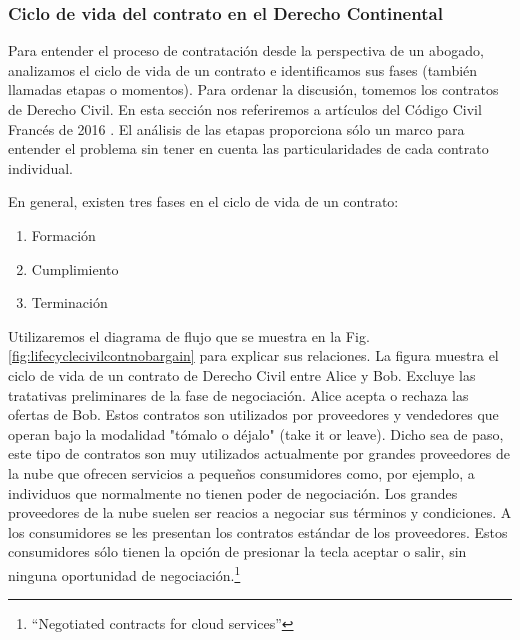 \documentclass[12pt]{report} %
\begin{document}
\subsubsection{ Ciclo de vida del contrato en el Derecho Continental}


Para entender el proceso de contratación desde la perspectiva de un abogado, analizamos el ciclo de vida de un contrato e identificamos sus fases (también llamadas etapas o momentos). Para ordenar la discusión, tomemos los contratos de Derecho Civil. En esta sección nos referiremos a artículos del Código Civil Francés de 2016 . El análisis de las etapas proporciona sólo un marco para entender el problema sin tener en cuenta las particularidades de cada contrato individual. 

En general, existen tres fases en el ciclo de vida de un contrato:


\begin{enumerate}
    \item Formación 
    \item Cumplimiento
    \item Terminación   
\end{enumerate}

Utilizaremos el diagrama de flujo que se muestra en la Fig. \ref{fig:lifecyclecivilcontnobargain} para explicar sus relaciones. La figura muestra el ciclo de vida de un contrato de Derecho Civil entre Alice y Bob. Excluye las tratativas preliminares de la fase de negociación. Alice acepta o rechaza las ofertas de Bob. Estos contratos son utilizados por proveedores y vendedores que operan bajo la modalidad "tómalo o déjalo" (take it or leave). Dicho sea de paso, este tipo de contratos son muy utilizados actualmente por grandes proveedores de la nube que ofrecen servicios a pequeños consumidores como, por ejemplo, a individuos que normalmente no tienen poder de negociación. Los grandes proveedores de la nube suelen ser reacios a negociar sus términos y condiciones. A los consumidores se les presentan los contratos estándar de los proveedores. Estos consumidores sólo tienen la opción de presionar la tecla aceptar o salir, sin ninguna oportunidad de negociación.\footnote{\cite{WKuan2013}“Negotiated contracts for cloud services” } 
\end{document}
